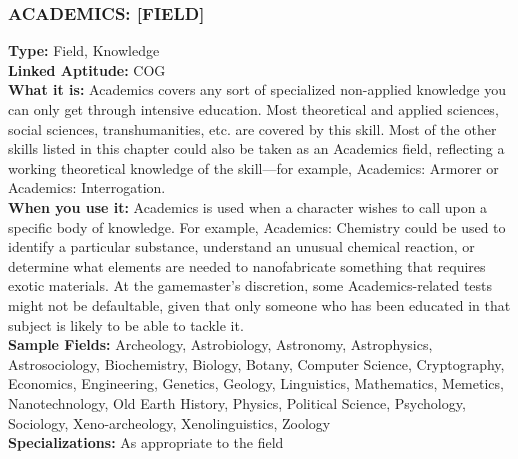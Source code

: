 \subsubsection{ACADEMICS: [FIELD]}
\textbf{Type:} Field, Knowledge
\\ \textbf{Linked Aptitude:} COG
\\ \textbf{What it is:}
Academics covers any sort of specialized
non-applied knowledge you can only get
through intensive education. Most theoretical and
applied sciences, social sciences, transhumanities,
etc. are covered by this skill. Most of the other
skills listed in this chapter could also be taken as
an Academics field, reflecting a working theoretical
knowledge of the skill—for example, Academics:
Armorer or Academics: Interrogation.
\\ \textbf{When you use it:} Academics is used when a
character wishes to call upon a specific body of
knowledge. For example, Academics: Chemistry
could be used to identify a particular substance,
understand an unusual chemical reaction, or determine
what elements are needed to nanofabricate
something that requires exotic materials. At the
gamemaster’s discretion, some Academics-related
tests might not be defaultable, given that only
someone who has been educated in that subject is
likely to be able to tackle it.
\\ \textbf{Sample Fields:} Archeology, Astrobiology, Astronomy,
Astrophysics, Astrosociology, Biochemistry,
Biology, Botany, Computer Science,
Cryptography, Economics, Engineering, Genetics,
Geology, Linguistics, Mathematics, Memetics,
Nanotechnology, Old Earth History, Physics, Political Science, Psychology, Sociology, Xeno-archeology,
Xenolinguistics, Zoology
\\ \textbf{Specializations:} As appropriate to the field

